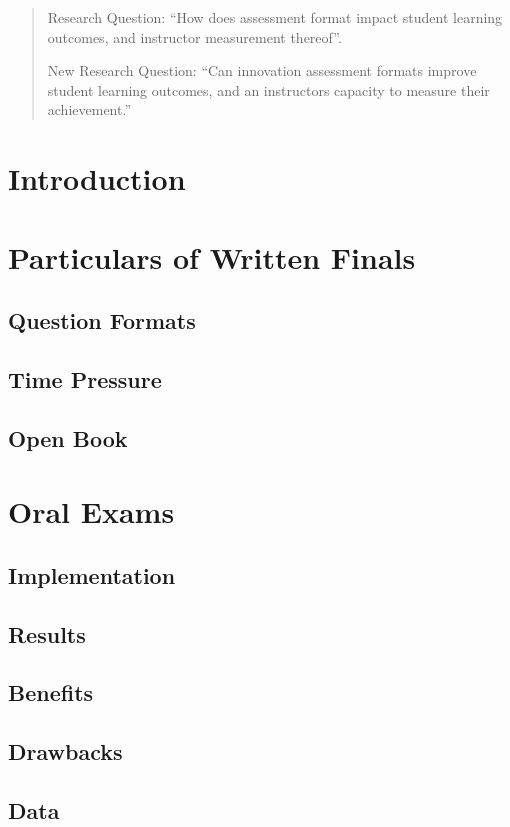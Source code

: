\documentclass{article}
\begin{document}
\begin{abstract}
Research Question: ``How does assessment format impact student learning outcomes, and instructor measurement thereof''.

New Research Question: ``Can innovation assessment formats improve student learning outcomes, and an instructors capacity to measure their achievement.''
\end{abstract}

\section{Introduction}

\section{Particulars of Written Finals}
\subsection{Question Formats}
\subsection{Time Pressure}
\subsection{Open Book}

\section{Oral Exams}
\subsection{Implementation}
\subsection{Results}
\subsection{Benefits}
\subsection{Drawbacks}
\subsection{Data}
\end{document}
